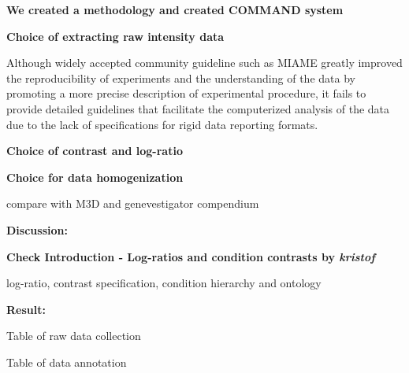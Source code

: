 \textbf{We created a methodology and created COMMAND system}

\textbf{Choice of extracting raw intensity data}


Although widely accepted community guideline such as MIAME \cite{Brazma2001}
greatly improved the reproducibility of experiments and the understanding of
the data by promoting a more precise description of experimental procedure, it
fails to provide detailed guidelines that facilitate the computerized analysis
of the data due to the lack of specifications for rigid data reporting formats.


\textbf{Choice of contrast and log-ratio}

\textbf{Choice for data homogenization}





compare with M3D and genevestigator compendium

\textbf{Discussion: }

\textbf{Check Introduction - Log-ratios and condition contrasts by 
\textit{kristof}}

log-ratio, contrast specification, condition hierarchy and ontology


\textbf{Result: }

Table of raw data collection

Table of data annotation





\cleardoublepage


